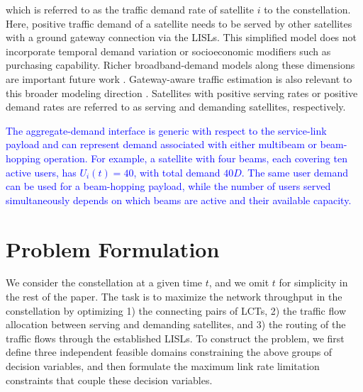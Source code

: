 \documentclass[journal]{IEEEtran}
\newcommand{\blue}[1]{\textcolor{blue}{#1}}
\begin{document}
which is referred to as the traffic demand rate of satellite $i$ to the constellation.
Here, positive traffic demand of a satellite needs to be served by other satellites with a ground gateway connection via the LISLs.
This simplified model does not incorporate temporal demand variation or socioeconomic modifiers such as purchasing capability. Richer broadband-demand models along these dimensions are important future work \cite{zamacola2025profiling,qin2024satformer}. Gateway-aware traffic estimation is also relevant to this broader modeling direction \cite{guo2021gateway}.
Satellites with positive serving rates or positive demand rates are referred to as serving and demanding satellites, respectively.

\blue{The aggregate-demand interface is generic with respect to the service-link payload and can represent demand associated with either multibeam or beam-hopping operation. For example, a satellite with four beams, each covering ten active users, has $U_i(t)=40$, with total demand $40D$. The same user demand can be used for a beam-hopping payload, while the number of users served simultaneously depends on which beams are active and their available capacity.}

\section{Problem Formulation}\label{sec:problem_formulation}
We consider the constellation at a given time $t$, and we omit $t$ for simplicity in the rest of the paper. 
The task is to maximize the network throughput in the constellation by optimizing 1) the connecting pairs of LCTs, 2) the traffic flow allocation between serving and demanding satellites, and 3) the routing of the traffic flows through the established LISLs.
To construct the problem, we first define three independent feasible domains constraining the above groups of decision variables, and then formulate the maximum link rate limitation constraints that couple these decision variables.
\end{document}
